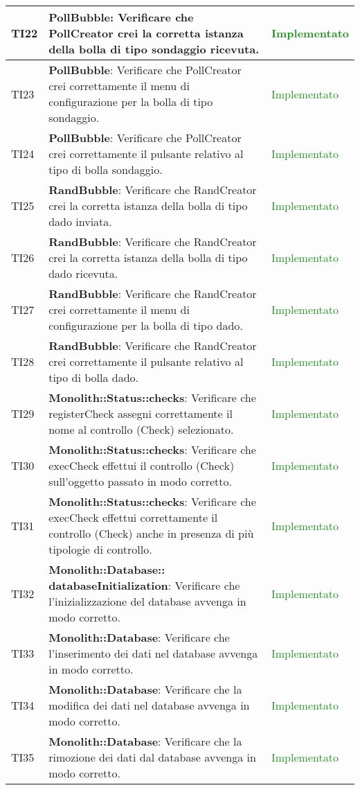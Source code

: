 \begin{center}
\begin{longtable}{|
*{1}{>{\centering\arraybackslash}p{1cm}|}
*{1}{>{\centering\arraybackslash}p{7cm}|}
*{1}{>{\centering\arraybackslash}p{3cm}|}}
 \hline 
TI22 & \textbf{PollBubble}: Verificare che PollCreator crei la corretta istanza della bolla di tipo sondaggio ricevuta. & \textcolor{ForestGreen}{Implementato}\\
 \hline 
TI23 & \textbf{PollBubble}: Verificare che PollCreator crei correttamente il menu di configurazione per la bolla di tipo sondaggio. & \textcolor{ForestGreen}{Implementato}\\
 \hline 
TI24 & \textbf{PollBubble}: Verificare che PollCreator crei correttamente il pulsante relativo al tipo di bolla sondaggio. & \textcolor{ForestGreen}{Implementato}\\
 \hline 
TI25 & \textbf{RandBubble}: Verificare che RandCreator crei la corretta istanza della bolla di tipo dado inviata. & \textcolor{ForestGreen}{Implementato}\\
 \hline 
TI26 & \textbf{RandBubble}: Verificare che RandCreator crei la corretta istanza della bolla di tipo dado ricevuta. & \textcolor{ForestGreen}{Implementato}\\
 \hline 
TI27 & \textbf{RandBubble}: Verificare che RandCreator crei correttamente il menu di configurazione per la bolla di tipo dado. & \textcolor{ForestGreen}{Implementato}\\
 \hline 
TI28 & \textbf{RandBubble}: Verificare che RandCreator crei correttamente il pulsante relativo al tipo di bolla dado. & \textcolor{ForestGreen}{Implementato}\\
 \hline 
TI29 & \textbf{Monolith::Status::checks}: Verificare che registerCheck assegni correttamente il nome al controllo (Check) selezionato. & \textcolor{ForestGreen}{Implementato}\\
 \hline 
TI30 & \textbf{Monolith::Status::checks}: Verificare che execCheck effettui il controllo (Check) sull'oggetto passato in modo corretto. & \textcolor{ForestGreen}{Implementato}\\
 \hline 
TI31 & \textbf{Monolith::Status::checks}: Verificare che execCheck effettui correttamente il controllo (Check) anche in presenza di più tipologie di controllo. & \textcolor{ForestGreen}{Implementato}\\
 \hline 
TI32 & \textbf{Monolith::Database:: databaseInitialization}: Verificare che l'inizializzazione del database avvenga in modo corretto. & \textcolor{ForestGreen}{Implementato}\\
 \hline 
TI33 & \textbf{Monolith::Database}: Verificare che l'inserimento dei dati nel database avvenga in modo corretto. & \textcolor{ForestGreen}{Implementato}\\
 \hline 
TI34 & \textbf{Monolith::Database}: Verificare che la modifica dei dati nel database avvenga in modo corretto. & \textcolor{ForestGreen}{Implementato}\\
 \hline 
TI35 & \textbf{Monolith::Database}: Verificare che la rimozione dei dati dal database avvenga in modo corretto. & \textcolor{ForestGreen}{Implementato}\\
 \hline 
\end{longtable}
\end{center}